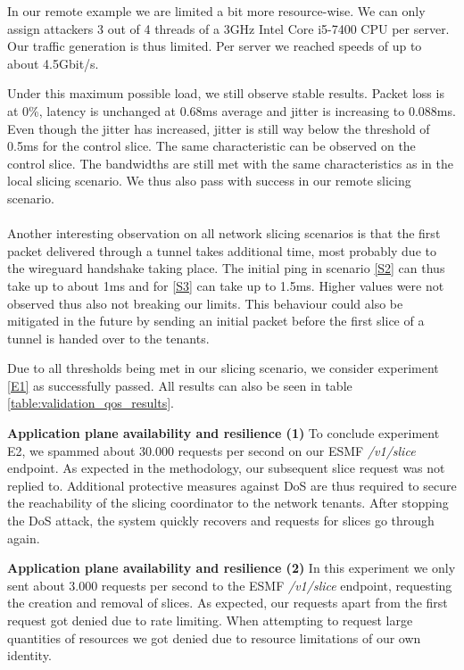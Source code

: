 \begin{description}[style=multiline, labelwidth=0.7cm]
    In our remote example we are limited a bit more resource-wise. We can only assign attackers 3 out of 4 threads of a 3GHz Intel Core i5-7400 CPU per server. Our traffic generation is thus limited. Per server we reached speeds of up to about 4.5Gbit/s.

    Under this maximum possible load, we still observe stable results. Packet loss is at 0\%, latency is unchanged at 0.68ms average and jitter is increasing to 0.088ms. Even though the jitter has increased, jitter is still way below the threshold of 0.5ms for the control slice. The same characteristic can be observed on the control slice. The bandwidths are still met with the same characteristics as in the local slicing scenario. We thus also pass with success in our remote slicing scenario.

    \paragraph{} Another interesting observation on all network slicing scenarios is that the first packet delivered through a tunnel takes additional time, most probably due to the wireguard handshake taking place. The initial ping in scenario \ref{S2} can thus take up to about 1ms and for \ref{S3} can take up to 1.5ms. Higher values were not observed thus also not breaking our limits. This behaviour could also be mitigated in the future by sending an initial packet before the first slice of a tunnel is handed over to the tenants.

    Due to all thresholds being met in our slicing scenario, we consider experiment \ref{E1} as successfully passed. All results can also be seen in table \ref{table:validation_qos_results}.

   \item[\ref{E2}] \textbf{Application plane availability and resilience (1)} To conclude experiment E2, we spammed about 30.000 requests per second on our ESMF \textit{/v1/slice} endpoint. As expected in the methodology, our subsequent slice request was not replied to. Additional protective measures against DoS are thus required to secure the reachability of the slicing coordinator to the network tenants. After stopping the DoS attack, the system quickly recovers and requests for slices go through again.

   \item[\ref{E3}] \textbf{Application plane availability and resilience (2)} In this experiment we only sent about 3.000 requests per second to the ESMF \textit{/v1/slice} endpoint, requesting the creation and removal of slices. As expected, our requests apart from the first request got denied due to rate limiting. When attempting to request large quantities of resources we got denied due to resource limitations of our own identity.


\end{description}
